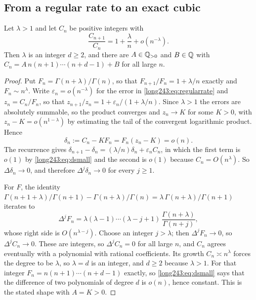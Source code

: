\documentclass[11pt]{article}
\begin{document}
\subsection{From a regular rate to an exact cubic}

\begin{lemma}\label{long243:res:extraction}
Let $\lambda>1$ and let $C_n$ be positive integers with
\begin{equation}\label{long243:eq:regularrate}
 \frac{C_{n+1}}{C_n}=1+\frac\lambda n+o(n^{-\lambda}).
\end{equation}
Then $\lambda$ is an integer $d\ge2$, and there are $A\in\mathbb{Q}_{>0}$ and
$B\in\mathbb{Q}$ with $C_n=A\,n(n+1)\cdots(n+d-1)+B$ for all large $n$.
\end{lemma}

\begin{proof}
Put $F_n=\Gamma(n+\lambda)/\Gamma(n)$, so that $F_{n+1}/F_n=1+\lambda/n$
exactly and $F_n\sim n^\lambda$.  Write $\varepsilon_n=o(n^{-\lambda})$ for the
error in \eqref{long243:eq:regularrate} and $z_n=C_n/F_n$, so that
$z_{n+1}/z_n=1+\varepsilon_n/(1+\lambda/n)$.  Since $\lambda>1$ the errors are
absolutely summable, so the product converges and $z_n\to K$ for some $K>0$,
with $z_n-K=o(n^{1-\lambda})$ by estimating the tail of the convergent
logarithmic product.  Hence
\begin{equation}\label{long243:eq:dsmall}
 \delta_n:=C_n-KF_n=F_n(z_n-K)=o(n).
\end{equation}
The recurrence gives
$\delta_{n+1}-\delta_n=(\lambda/n)\delta_n+\varepsilon_nC_n$, in which the
first term is $o(1)$ by \eqref{long243:eq:dsmall} and the second is $o(1)$ because
$C_n=O(n^\lambda)$.  So $\Delta\delta_n\to0$, and therefore
$\Delta^j\delta_n\to0$ for every $j\ge1$.

For $F$, the identity $\Gamma(n+1+\lambda)/\Gamma(n+1)-\Gamma(n+\lambda)/\Gamma(n)
=\lambda\,\Gamma(n+\lambda)/\Gamma(n+1)$ iterates to
\[
 \Delta^jF_n=\lambda(\lambda-1)\cdots(\lambda-j+1)\,
 \frac{\Gamma(n+\lambda)}{\Gamma(n+j)},
\]
whose right side is $O(n^{\lambda-j})$.  Choose an integer $j>\lambda$; then
$\Delta^jF_n\to0$, so $\Delta^jC_n\to0$.  These are integers, so
$\Delta^jC_n=0$ for all large $n$, and $C_n$ agrees eventually with a
polynomial with rational coefficients.  Its growth $C_n\asymp n^\lambda$ forces
the degree to be $\lambda$, so $\lambda=d$ is an integer, and $d\ge2$ because
$\lambda>1$.  For that integer $F_n=n(n+1)\cdots(n+d-1)$ exactly, so
\eqref{long243:eq:dsmall} says that the difference of two polynomials of degree $d$ is
$o(n)$, hence constant.  This is the stated shape with $A=K>0$.
\end{proof}
\end{document}
